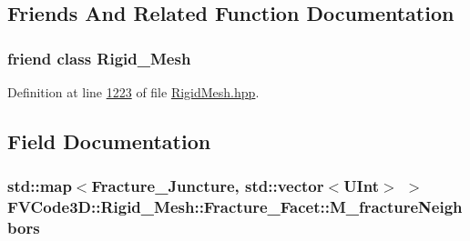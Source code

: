 \subsection{Friends And Related Function Documentation}
\subsubsection[{\texorpdfstring{Rigid\+\_\+\+Mesh}{Rigid_Mesh}}]{\setlength{\rightskip}{0pt plus 5cm}friend class {\bf Rigid\+\_\+\+Mesh}\hspace{0.3cm}{\ttfamily [friend]}}\hypertarget{classFVCode3D_1_1Rigid__Mesh_1_1Fracture__Facet_a43983e56a64f3bc6fc936f03c4b170bb}{}\label{classFVCode3D_1_1Rigid__Mesh_1_1Fracture__Facet_a43983e56a64f3bc6fc936f03c4b170bb}


Definition at line \hyperlink{RigidMesh_8hpp_source_l01223}{1223} of file \hyperlink{RigidMesh_8hpp_source}{Rigid\+Mesh.\+hpp}.



\subsection{Field Documentation}
\subsubsection[{\texorpdfstring{M\+\_\+fracture\+Neighbors}{M_fractureNeighbors}}]{\setlength{\rightskip}{0pt plus 5cm}std\+::map$<${\bf Fracture\+\_\+\+Juncture}, std\+::vector$<${\bf U\+Int}$>$ $>$ F\+V\+Code3\+D\+::\+Rigid\+\_\+\+Mesh\+::\+Fracture\+\_\+\+Facet\+::\+M\+\_\+fracture\+Neighbors\hspace{0.3cm}{\ttfamily [private]}}\hypertarget{classFVCode3D_1_1Rigid__Mesh_1_1Fracture__Facet_ac1812d6492dbf2b3a270cc8db789471f}{}\label{classFVCode3D_1_1Rigid__Mesh_1_1Fracture__Facet_ac1812d6492dbf2b3a270cc8db789471f}


